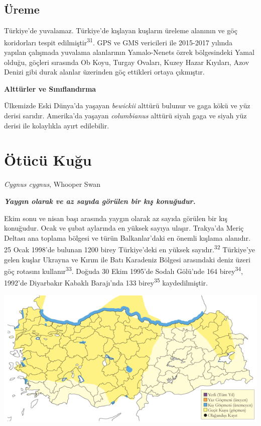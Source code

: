 \documentclass[
  letterpaper,
  DIV=11,
  numbers=noendperiod]{scrreprt}
\begin{document}
\hypertarget{uxfcreme-8}{%
\subsection{\texorpdfstring{\textbf{Üreme}}{Üreme}}\label{uxfcreme-8}}

Türkiye'de yuvalamaz. Türkiye'de kışlayan kuşların üreleme alanının ve
göç koridorları tespit edilmiştir\textsuperscript{31}. GPS ve GMS
vericileri ile 2015-2017 yılında yapılan çalışmada yuvalama alanlarının
Yamalo-Nenets özrek bölgesindeki Yamal olduğu, göçleri sırasında Ob
Koyu, Turgay Ovaları, Kuzey Hazar Kıyıları, Azov Denizi gibi durak
alanlar üzerinden göç ettikleri ortaya çıkmıştır.

\textbf{Alttürler ve Sınıflandırma}

Ülkemizde Eski Dünya'da yaşayan \emph{bewickii} alttürü bulunur ve gaga
kökü ve yüz derisi sarıdır. Amerika'da yaşayan \emph{columbianus}
alttürü siyah gaga ve siyah yüz derisi ile kolaylıkla ayırt edilebilir.

\hypertarget{uxf6tuxfccuxfc-kuux11fu}{%
\section{Ötücü Kuğu}\label{uxf6tuxfccuxfc-kuux11fu}}

\emph{Cygnus cygnus}, Whooper Swan

\textbf{\emph{Yaygın olarak ve az sayıda görülen bir kış konuğudur.}}

Ekim sonu ve nisan başı arasında yaygın olarak az sayıda görülen bir kış
konuğudur. Ocak ve şubat aylarında en yüksek sayıya ulaşır. Trakya'da
Meriç Deltası ana toplama bölgesi ve türün Balkanlar'daki en önemli
kışlama alanıdır. 25 Ocak 1998'de bulunan 1200 birey Türkiye'deki en
yüksek sayıdır.\textsuperscript{32} Türkiye'ye gelen kuşlar Ukrayna ve
Kırım ile Batı Karadeniz Bölgesi arasındaki deniz üzeri göç rotasını
kullanır\textsuperscript{33}. Doğuda 30 Ekim 1995'de Sodalı Gölü'nde 164
birey\textsuperscript{34}, 1992'de Diyarbakır Kabaklı Barajı'nda 133
birey\textsuperscript{35} kaydedilmiştir.

\includegraphics{images/harita_Page_010.png}
\end{document}
